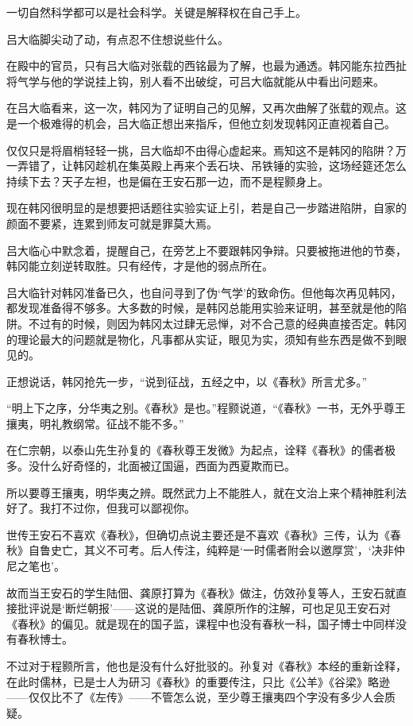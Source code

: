 一切自然科学都可以是社会科学。关键是解释权在自己手上。

吕大临脚尖动了动，有点忍不住想说些什么。

在殿中的官员，只有吕大临对张载的西铭最为了解，也最为通透。韩冈能东拉西扯将气学与他的学说挂上钩，别人看不出破绽，可吕大临就能从中看出问题来。

在吕大临看来，这一次，韩冈为了证明自己的见解，又再次曲解了张载的观点。这是一个极难得的机会，吕大临正想出来指斥，但他立刻发现韩冈正直视着自己。

仅仅只是将眉梢轻轻一挑，吕大临却不由得心虚起来。焉知这不是韩冈的陷阱？万一弄错了，让韩冈趁机在集英殿上再来个丢石块、吊铁锤的实验，这场经筵还怎么持续下去？天子左袒，也是偏在王安石那一边，而不是程颢身上。

现在韩冈很明显的是想要把话题往实验实证上引，若是自己一步踏进陷阱，自家的颜面不要紧，连累到师友可就是罪莫大焉。

吕大临心中默念着，提醒自己，在旁艺上不要跟韩冈争辩。只要被拖进他的节奏，韩冈能立刻逆转取胜。只有经传，才是他的弱点所在。

吕大临针对韩冈准备已久，也自问寻到了伪‘气学’的致命伤。但他每次再见韩冈，都发现准备得不够多。大多数的时候，是韩冈总能用实验来证明，甚至就是他的陷阱。不过有的时候，则因为韩冈太过肆无忌惮，对不合己意的经典直接否定。韩冈的理论最大的问题就是物化，凡事都从实证，眼见为实，须知有些东西是做不到眼见的。

正想说话，韩冈抢先一步，“说到征战，五经之中，以《春秋》所言尤多。”

“明上下之序，分华夷之别。《春秋》是也。”程颢说道，“《春秋》一书，无外乎尊王攘夷，明礼教纲常。征战不能不多。”

在仁宗朝，以泰山先生孙复的《春秋尊王发微》为起点，诠释《春秋》的儒者极多。没什么好奇怪的，北面被辽国逼，西面为西夏欺而已。

所以要尊王攘夷，明华夷之辨。既然武力上不能胜人，就在文治上来个精神胜利法好了。我打不过你，但我可以鄙视你。

世传王安石不喜欢《春秋》，但确切点说主要还是不喜欢《春秋》三传，认为《春秋》自鲁史亡，其义不可考。后人传注，纯粹是‘一时儒者附会以邀厚赏’，‘决非仲尼之笔也’。

故而当王安石的学生陆佃、龚原打算为《春秋》做注，仿效孙复等人，王安石就直接批评说是‘断烂朝报’——这说的是陆佃、龚原所作的注解，可也足见王安石对《春秋》的偏见。就是现在的国子监，课程中也没有春秋一科，国子博士中同样没有春秋博士。

不过对于程颢所言，他也是没有什么好批驳的。孙复对《春秋》本经的重新诠释，在此时儒林，已是士人为研习《春秋》的重要传注，只比《公羊》《谷梁》略逊——仅仅比不了《左传》——不管怎么说，至少尊王攘夷四个字没有多少人会质疑。

